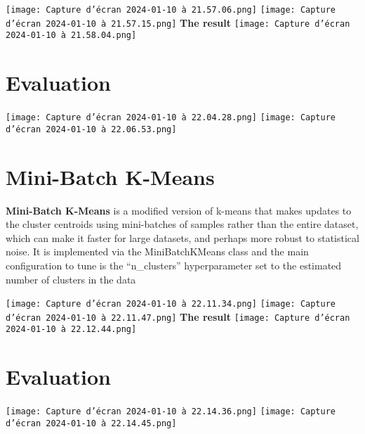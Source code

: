 \documentclass[12pt,a4paper]{report}
\begin{document}
\begin{center}
    \texttt{[image: Capture d’écran 2024-01-10 à 21.57.06.png]}
     \texttt{[image: Capture d’écran 2024-01-10 à 21.57.15.png]}
   \textbf{The result}
   \texttt{[image: Capture d’écran 2024-01-10 à 21.58.04.png]}
\end{center} 

\section{Evaluation}
\begin{center}
    \texttt{[image: Capture d’écran 2024-01-10 à 22.04.28.png]}
    \texttt{[image: Capture d’écran 2024-01-10 à 22.06.53.png]}
  
   
\end{center} 
\section{Mini-Batch K-Means}
\textbf{Mini-Batch K-Means} is a modified version of k-means that makes updates to the cluster centroids using mini-batches of samples rather than the entire dataset, which can make it faster for large datasets, and perhaps more robust to statistical noise. It is implemented via the MiniBatchKMeans class and the main configuration to tune is the “n\_clusters” hyperparameter set to the estimated number of clusters in the data\\

\begin{center}
    \texttt{[image: Capture d’écran 2024-01-10 à 22.11.34.png]}
     \texttt{[image: Capture d’écran 2024-01-10 à 22.11.47.png]}
   \textbf{The result}
   \texttt{[image: Capture d’écran 2024-01-10 à 22.12.44.png]}
\end{center} 

\section{Evaluation}
\begin{center}
    \texttt{[image: Capture d’écran 2024-01-10 à 22.14.36.png]}
    \texttt{[image: Capture d’écran 2024-01-10 à 22.14.45.png]}
  
   
\end{center} 
\end{document}
